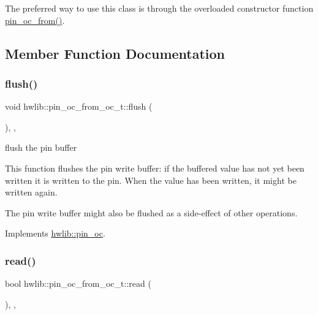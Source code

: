 The preferred way to use this class is through the overloaded constructor function \hyperlink{namespacehwlib_aa2c63efcb24f3d5124567356d8c8a804}{pin\+\_\+oc\+\_\+from()}. 

\subsection{Member Function Documentation}
\mbox{\label{classhwlib_1_1pin__oc__from__oc__t_a20b667326a27ae3156874fc308d4e795}} 
\subsubsection{\texorpdfstring{flush()}{flush()}}
{\footnotesize\ttfamily void hwlib\+::pin\+\_\+oc\+\_\+from\+\_\+oc\+\_\+t\+::flush (\begin{DoxyParamCaption}{ }\end{DoxyParamCaption})\hspace{0.3cm}{\ttfamily [inline]}, {\ttfamily [override]}, {\ttfamily [virtual]}}





flush the pin buffer

This function flushes the pin write buffer\+: if the buffered value has not yet been written it is written to the pin. When the value has been written, it might be written again.

The pin write buffer might also be flushed as a side-\/effect of other operations. 

Implements \hyperlink{classhwlib_1_1pin__oc_a021036a4566c712e43250ddd28a85e54}{hwlib\+::pin\+\_\+oc}.

\mbox{\label{classhwlib_1_1pin__oc__from__oc__t_aa896dfa412fe5644e0096b38c739cd42}} 
\subsubsection{\texorpdfstring{read()}{read()}}
{\footnotesize\ttfamily bool hwlib\+::pin\+\_\+oc\+\_\+from\+\_\+oc\+\_\+t\+::read (\begin{DoxyParamCaption}{ }\end{DoxyParamCaption})\hspace{0.3cm}{\ttfamily [inline]}, {\ttfamily [override]}, {\ttfamily [virtual]}}





